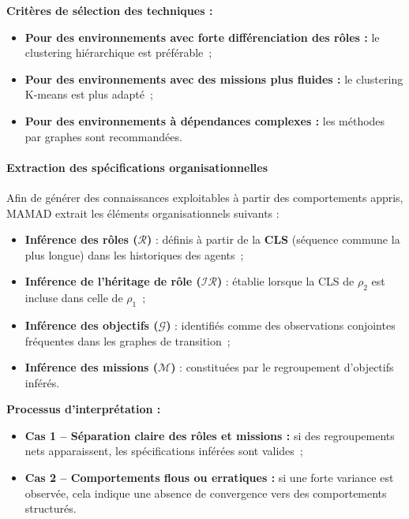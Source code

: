 \vspace{0.4em}
\noindent \textbf{Critères de sélection des techniques :}
\begin{itemize}
    \item \textbf{Pour des environnements avec forte différenciation des rôles :} le clustering hiérarchique est préférable~;
    \item \textbf{Pour des environnements avec des missions plus fluides :} le clustering K-means est plus adapté~;
    \item \textbf{Pour des environnements à dépendances complexes :} les méthodes par graphes sont recommandées.
\end{itemize}

\paragraph{Extraction des spécifications organisationnelles}

Afin de générer des connaissances exploitables à partir des comportements appris, MAMAD extrait les éléments organisationnels suivants :

\begin{itemize}
    \item \textbf{Inférence des rôles ($\mathcal{R}$)} : définis à partir de la \textbf{CLS} (séquence commune la plus longue) dans les historiques des agents~;
    \item \textbf{Inférence de l'héritage de rôle ($\mathcal{IR}$)} : établie lorsque la CLS de $\rho_2$ est incluse dans celle de $\rho_1$~;
    \item \textbf{Inférence des objectifs ($\mathcal{G}$)} : identifiés comme des observations conjointes fréquentes dans les graphes de transition~;
    \item \textbf{Inférence des missions ($\mathcal{M}$)} : constituées par le regroupement d'objectifs inférés.
\end{itemize}

\vspace{0.4em}
\noindent \textbf{Processus d'interprétation :}
\begin{itemize}
    \item \textbf{Cas 1 – Séparation claire des rôles et missions :} si des regroupements nets apparaissent, les spécifications inférées sont valides~;
    \item \textbf{Cas 2 – Comportements flous ou erratiques :} si une forte variance est observée, cela indique une absence de convergence vers des comportements structurés.
\end{itemize}


